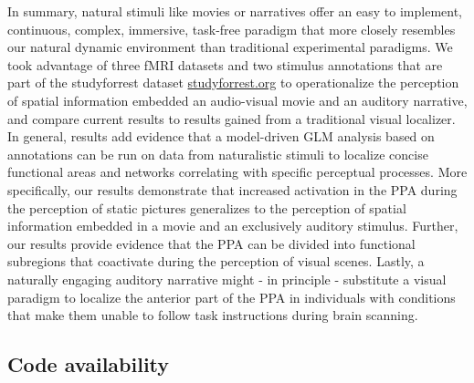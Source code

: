 \documentclass[english]{article}
\begin{document}
In summary, natural stimuli like movies \citep{eickhoff2020towards,
hasson2008neurocinematics, sonkusare2019naturalistic} or narratives
\citep{hamilton2018revolution, honey2012not, lerner2011topographic,
silbert2014coupled, wilson2008beyond} offer an easy to implement, continuous,
complex, immersive, task-free paradigm that more closely resembles our natural
dynamic environment than traditional experimental paradigms.
We took advantage of three fMRI datasets and two stimulus annotations that are
part of the studyforrest dataset
\href{http://www.studyforrest.org}{studyforrest.org} to operationalize the
perception of spatial information embedded an audio-visual movie and an auditory
narrative, and compare current results to results gained from a traditional
visual localizer.
In general, results add evidence that a model-driven GLM analysis based on
annotations can be run on data from naturalistic stimuli to localize concise
functional areas and networks correlating with specific perceptual processes.
More specifically, our results demonstrate that increased activation in the PPA
during the perception of static pictures generalizes to the perception of
spatial information embedded in a movie and an exclusively auditory stimulus.
Further, our results provide evidence that the PPA can be divided into
functional subregions that coactivate during the perception of visual
scenes.
Lastly, a naturally engaging auditory narrative might - in principle -
substitute a visual paradigm to localize the anterior part of the PPA in
individuals with conditions that make them unable to follow task instructions
during brain scanning.


\subsection*{Code availability}




\end{document}
